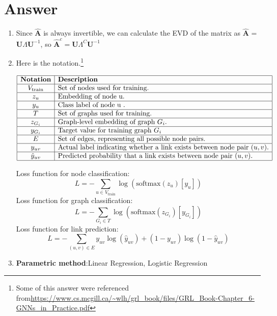 \documentclass[
	12pt, %
]{fphw}
\begin{document}
\section*{Answer}
\begin{enumerate}
\item Since $\hat{\mathbf{A}}$ is always invertible, we can calculate the EVD of the matrix as $\hat{\mathbf{A}}$ = $\mathbf{U} \Lambda \mathbf{U}^{-1}$, so $\hat{\mathbf{A}}^c = \mathbf{U} \Lambda^C \mathbf{U}^{-1}$
\item Here is the notation.\footnote{Some of this answer were referenced from\url{https://www.cs.mcgill.ca/~wlh/grl_book/files/GRL_Book-Chapter_6-GNNs_in_Practice.pdf}}

$\begin{array}{|c|l|}
	\hline
	\textbf{Notation} & \textbf{Description} \\
	\hline
	V_{\text{train}} & \text{Set of nodes used for training.} \\
	\hline
	z_u & \text{Embedding of node u.} \\
	\hline
	y_u & \text{Class label of node u .} \\
	\hline
	T & \text{Set of graphs used for training.} \\
	\hline
	z_{G_i} & \text{Graph-level embedding of graph } G_i. \\
	\hline
	y_{G_i} & \text{Target value for training graph } G_i  \\
	\hline
	E & \text{Set of edges, representing all possible node pairs.} \\
	\hline
	y_{uv} & \text{Actual label indicating whether a link exists between node pair } (u, v). \\
	\hline
	\hat{y}_{uv} & \text{Predicted probability that a link exists between node pair } (u, v). \\

	\hline
	
	\end{array}
$	

Loss function for node classification: 
\begin{equation*}
	L = -\sum_{u \in V_{\text{train}}} \log(\text{softmax}(z_u)[y_u])
\end{equation*}
Loss function for graph classification:
\begin{equation*}
	L = -\sum_{G_i \in T} \log(\text{softmax}(z_{G_i})[y_{G_i}])
\end{equation*}	
Loss function for link prediction:
\begin{equation*}
L = -\sum_{(u, v) \in E} y_{uv} \log(\hat{y}_{uv}) + (1 - y_{uv}) \log(1 - \hat{y}_{uv})
\end{equation*}	
\newpage
\item\textbf{Parametric method}:Linear Regression, Logistic Regression


\end{enumerate}
\end{document}
